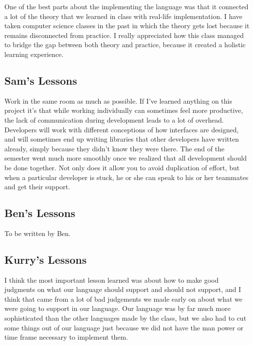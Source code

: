 \documentclass{book}
\begin{document}
One of the best parts about the implementing the language was that it connected a lot of the theory that we learned in class with real-life implementation.  I have taken computer science classes in the past in which the theory gets lost because it remains disconnected from practice. I really appreciated how this class managed to bridge the gap between both theory and practice, because it created a holistic learning experience.



\subsection{Sam's Lessons}
\label{sub:sams-lessons}

Work in the same room as much as possible. If I've learned anything on this
project it's that while working individually can sometimes feel more
productive, the lack of communication during development leads to a lot of
overhead. Developers will work with different conceptions of how interfaces are
designed, and will sometimes end up writing libraries that other developers
have written already, simply because they didn't know they were there. The end
of the semester went much more smoothly once we realized that all development
should be done together. Not only does it allow you to avoid duplication of effort, but
when a particular developer is stuck, he or she can speak to his or her teammates and
get their support.

\subsection{Ben's Lessons} \label{sub:bens-lessons}

To be written by Ben.

\subsection{Kurry's Lessons}
\label{sub:kurrys-lessons}

I think the most important lesson learned was about how to make good judgments
on what our language should support and should not support, and I think that
came from a lot of bad judgements we made early on about what we were going to
support in our language. Our language was by far much more sophisticated than the
other languages made by the class, but we also had to cut some things out of our
language just because we did not have the man power or time frame necessary to
implement them. 
\end{document}
